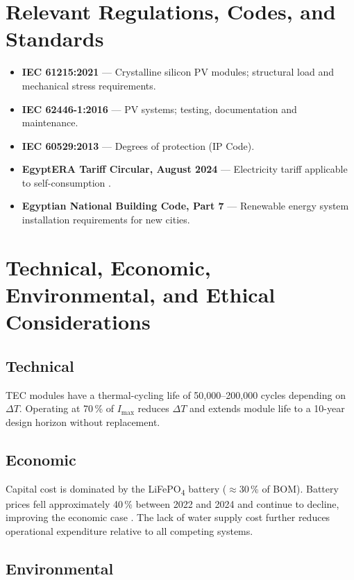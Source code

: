 \documentclass[12pt,a4paper]{report}
\numberwithin{equation}{chapter}
\numberwithin{figure}{chapter}
\numberwithin{table}{chapter}
\begin{document}
\section{Relevant Regulations, Codes, and Standards}

\begin{itemize}[leftmargin=*]
  \item \textbf{IEC 61215:2021} --- Crystalline silicon PV modules; structural load and
        mechanical stress requirements.
  \item \textbf{IEC 62446-1:2016} --- PV systems; testing, documentation and maintenance.
  \item \textbf{IEC 60529:2013} --- Degrees of protection (IP Code).
  \item \textbf{EgyptERA Tariff Circular, August 2024} --- Electricity tariff applicable
        to self-consumption \cite{egyptera_tariff}.
  \item \textbf{Egyptian National Building Code, Part 7} --- Renewable energy system
        installation requirements for new cities.
\end{itemize}

\section{Technical, Economic, Environmental, and Ethical Considerations}

\subsection{Technical}

TEC modules have a thermal-cycling life of 50,000--200,000 cycles depending on $\Delta T$.
Operating at 70\,\% of $I_\mathrm{max}$ reduces $\Delta T$ and extends module life to a
10-year design horizon without replacement.

\subsection{Economic}

Capital cost is dominated by the LiFePO\textsubscript{4} battery ($\approx$30\,\% of BOM).
Battery prices fell approximately 40\,\% between 2022 and 2024 and continue to decline,
improving the economic case \cite{irena2023egypt}. The lack of water supply cost further
reduces operational expenditure relative to all competing systems.

\subsection{Environmental}
\end{document}
